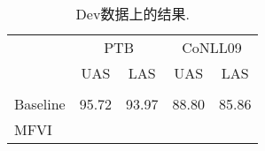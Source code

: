 \begin{table}[tb!]
  \centering
  \begin{tabular}{lcccc}
    \toprule
             & \multicolumn{2}{c}{PTB} & \multicolumn{2}{c}{CoNLL09}                 \\
             & UAS                     & LAS                         & UAS   & LAS   \\[2pt]
    \hline
    \\[-15pt]
    Baseline & 95.72                   & 93.97                       & 88.80 & 85.86 \\[3pt]
    MFVI     &                         &                             &       &       \\
    \bottomrule
  \end{tabular}
  \caption{Dev数据上的结果.}
  \label{table:dev-test}
\end{table}


